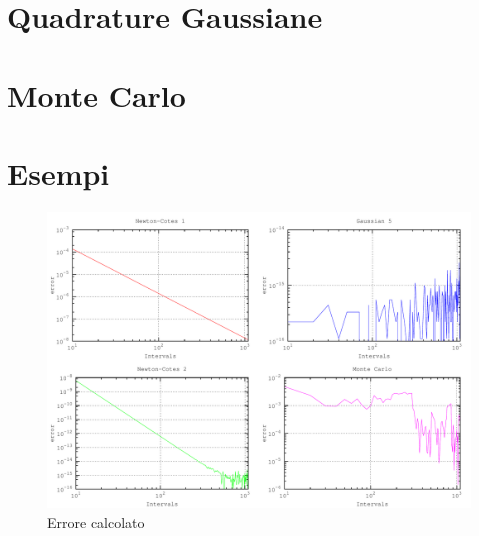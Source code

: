 \section{Quadrature Gaussiane}
\section{Monte Carlo}

\section{Esempi}
\begin{figure}[h]
\centering
\includegraphics[width=\textwidth]{integral}
\caption{Errore calcolato}
\label{fig:integral}
\end{figure}

